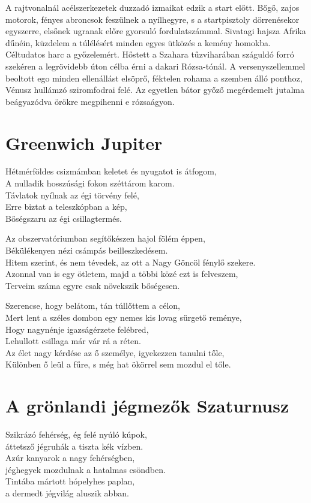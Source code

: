 A rajtvonalnál acélszerkezetek duzzadó izmaikat ed\-zik a start előtt.
Bőgő, zajos motorok, fényes abroncsok feszülnek a nyílhegyre, s a
startpisztoly dörrenésekor egyszerre, elsőnek ugranak előre gyorsuló
fordulatszámmal. Sivatagi hajsza Afrika dűnéin, küzdelem a túlélésért
minden egyes ütközés a kemény homokba. Céltudatos harc a győzelemért.
Hőstett a Szahara tűzviharában száguldó forró szekéren a
legrövidebb úton célba érni a dakari Rózsa-tónál. A versenyszellemmel
beoltott ego minden ellenállást elsöprő, féktelen rohama a szemben
álló ponthoz, Vénusz hullámzó sziromfodrai felé. Az egyetlen
bátor győző megérdemelt jutalma beágyazódva örökre megpihenni e
rózsaágyon.

\section{Greenwich \hfill Jupiter}

\begin{LVerse}
Hétmérföldes csizmámban keletet és nyugatot is átfogom,			\\
A nulladik hosszúsági fokon széttárom karom.				\\
Távlatok nyílnak az égi törvény felé,					\\
Erre biztat a teleszkópban a kép,					\\
Bőségszaru az égi csillagtermés.

Az obszervatóriumban segítőkészen hajol fölém éppen,			\\
Békülékenyen nézi csámpás beilleszkedésem.				\\
Hitem szerint, és nem tévedek, az ott a Nagy Göncöl fénylő szekere.	\\
Azonnal van is egy ötletem, majd a többi közé ezt is felveszem,		\\
Terveim száma egyre csak növekszik bőségesen.

Szerencse, hogy belátom, tán túllőttem a célon,				\\
Mert lent a széles dombon egy nemes kis lovag sürgető reménye,		\\
Hogy nagynénje igazságérzete felébred,					\\
Lehullott csillaga már vár rá a réten.					\\
Az élet nagy kérdése az ő személye, igyekezzen tanulni tőle,		\\
Különben ő leül a fűre, s még hat ökörrel sem mozdul el tőle.
\end{LVerse}

\section{A grönlandi jégmezők \hfill Szaturnusz}

\begin{LVerse}
Szikrázó fehérség, ég felé nyúló kúpok,					\\
áttetsző jégruhák a tiszta kék vízben.					\\
Azúr kanyarok a nagy fehérségben,					\\
jéghegyek mozdulnak a hatalmas csöndben.				\\
Tintába mártott hópelyhes paplan,					\\
a dermedt jégvilág aluszik abban.
\end{LVerse}
